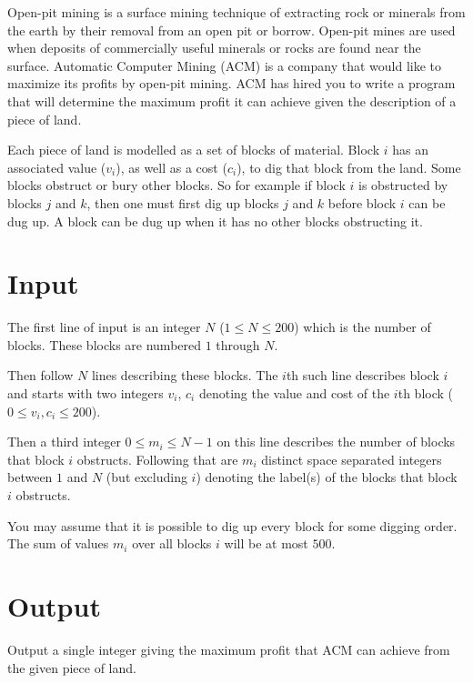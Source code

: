 
Open-pit mining is a surface mining technique of extracting rock or
minerals from the earth by their removal from an open pit or
borrow.  Open-pit mines are used when deposits of commercially useful
minerals or rocks are found near the surface.  Automatic Computer
Mining (ACM) is a company that would like to maximize its profits by
open-pit mining.  ACM has hired you to write a program that
will determine the maximum profit it can achieve given the
description of a piece of land.

Each piece of land is modelled as a set of blocks of material.  Block
$i$ has an associated value ($v_i$), as well as a cost ($c_i$), to dig
that block from the land.  Some blocks obstruct or bury other blocks.
So for example if block $i$ is obstructed by blocks $j$ and $k$, then
one must first dig up blocks $j$ and $k$ before block $i$ can be dug
up.  A block can be dug up when it has no other blocks obstructing it.



\section*{Input}

The first line of input is an integer $N$ ($1 \leq N \leq 200$)
which is the number of
blocks. These blocks are numbered $1$ through $N$.

Then follow $N$ lines describing these blocks. The $i$th such line 
describes block $i$ and starts with two integers $v_i$, $c_i$ denoting the 
value and cost of the $i$th block ($0 \leq v_i, c_i \leq 200$).

Then a third integer $0 \leq m_i \leq N-1$ on this line describes the 
number of blocks that block $i$ obstructs.  Following that are $m_i$ 
distinct space separated integers between $1$ and $N$ (but excluding $i$) 
denoting the label(s) of the blocks that block $i$ obstructs.

You may assume that it is possible to dig up every block for some digging 
order. The sum of values $m_i$ over all blocks $i$ will be at most $500$.

\section*{Output}

Output a single integer giving the maximum profit that ACM can achieve
from the given piece of land.
